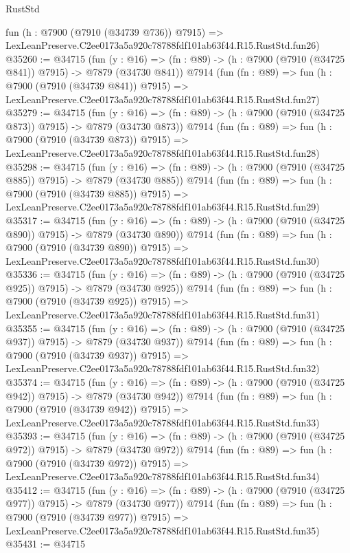 \begin{lexlean}{RustStd}
\begin{coremodule}
    fun (h : @7900 (@7910 (@34739 @736)) @7915) =>
    LexLeanPreserve.C2ee0173a5a920c78788fdf101ab63f44.R15.RustStd.fun26)
@35260 := @34715
    (fun (y : @16) => (fn : @89) -> (h : @7900 (@7910 (@34725 @841)) @7915) -> @7879 (@34730 @841))
    @7914
    (fun (fn : @89) =>
    fun (h : @7900 (@7910 (@34739 @841)) @7915) =>
    LexLeanPreserve.C2ee0173a5a920c78788fdf101ab63f44.R15.RustStd.fun27)
@35279 := @34715
    (fun (y : @16) => (fn : @89) -> (h : @7900 (@7910 (@34725 @873)) @7915) -> @7879 (@34730 @873))
    @7914
    (fun (fn : @89) =>
    fun (h : @7900 (@7910 (@34739 @873)) @7915) =>
    LexLeanPreserve.C2ee0173a5a920c78788fdf101ab63f44.R15.RustStd.fun28)
@35298 := @34715
    (fun (y : @16) => (fn : @89) -> (h : @7900 (@7910 (@34725 @885)) @7915) -> @7879 (@34730 @885))
    @7914
    (fun (fn : @89) =>
    fun (h : @7900 (@7910 (@34739 @885)) @7915) =>
    LexLeanPreserve.C2ee0173a5a920c78788fdf101ab63f44.R15.RustStd.fun29)
@35317 := @34715
    (fun (y : @16) => (fn : @89) -> (h : @7900 (@7910 (@34725 @890)) @7915) -> @7879 (@34730 @890))
    @7914
    (fun (fn : @89) =>
    fun (h : @7900 (@7910 (@34739 @890)) @7915) =>
    LexLeanPreserve.C2ee0173a5a920c78788fdf101ab63f44.R15.RustStd.fun30)
@35336 := @34715
    (fun (y : @16) => (fn : @89) -> (h : @7900 (@7910 (@34725 @925)) @7915) -> @7879 (@34730 @925))
    @7914
    (fun (fn : @89) =>
    fun (h : @7900 (@7910 (@34739 @925)) @7915) =>
    LexLeanPreserve.C2ee0173a5a920c78788fdf101ab63f44.R15.RustStd.fun31)
@35355 := @34715
    (fun (y : @16) => (fn : @89) -> (h : @7900 (@7910 (@34725 @937)) @7915) -> @7879 (@34730 @937))
    @7914
    (fun (fn : @89) =>
    fun (h : @7900 (@7910 (@34739 @937)) @7915) =>
    LexLeanPreserve.C2ee0173a5a920c78788fdf101ab63f44.R15.RustStd.fun32)
@35374 := @34715
    (fun (y : @16) => (fn : @89) -> (h : @7900 (@7910 (@34725 @942)) @7915) -> @7879 (@34730 @942))
    @7914
    (fun (fn : @89) =>
    fun (h : @7900 (@7910 (@34739 @942)) @7915) =>
    LexLeanPreserve.C2ee0173a5a920c78788fdf101ab63f44.R15.RustStd.fun33)
@35393 := @34715
    (fun (y : @16) => (fn : @89) -> (h : @7900 (@7910 (@34725 @972)) @7915) -> @7879 (@34730 @972))
    @7914
    (fun (fn : @89) =>
    fun (h : @7900 (@7910 (@34739 @972)) @7915) =>
    LexLeanPreserve.C2ee0173a5a920c78788fdf101ab63f44.R15.RustStd.fun34)
@35412 := @34715
    (fun (y : @16) => (fn : @89) -> (h : @7900 (@7910 (@34725 @977)) @7915) -> @7879 (@34730 @977))
    @7914
    (fun (fn : @89) =>
    fun (h : @7900 (@7910 (@34739 @977)) @7915) =>
    LexLeanPreserve.C2ee0173a5a920c78788fdf101ab63f44.R15.RustStd.fun35)
@35431 := @34715

\end{coremodule}
\end{lexlean}
